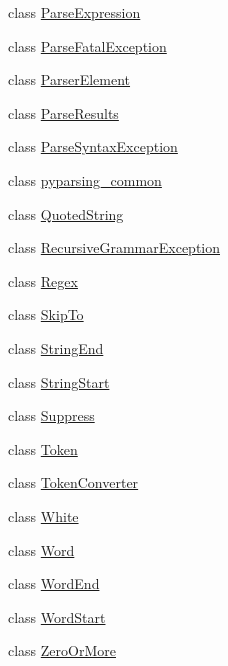 \begin{DoxyCompactItemize}
\item 
class \hyperlink{classpkg__resources_1_1__vendor_1_1pyparsing_1_1ParseExpression}{Parse\+Expression}
\item 
class \hyperlink{classpkg__resources_1_1__vendor_1_1pyparsing_1_1ParseFatalException}{Parse\+Fatal\+Exception}
\item 
class \hyperlink{classpkg__resources_1_1__vendor_1_1pyparsing_1_1ParserElement}{Parser\+Element}
\item 
class \hyperlink{classpkg__resources_1_1__vendor_1_1pyparsing_1_1ParseResults}{Parse\+Results}
\item 
class \hyperlink{classpkg__resources_1_1__vendor_1_1pyparsing_1_1ParseSyntaxException}{Parse\+Syntax\+Exception}
\item 
class \hyperlink{classpkg__resources_1_1__vendor_1_1pyparsing_1_1pyparsing__common}{pyparsing\+\_\+common}
\item 
class \hyperlink{classpkg__resources_1_1__vendor_1_1pyparsing_1_1QuotedString}{Quoted\+String}
\item 
class \hyperlink{classpkg__resources_1_1__vendor_1_1pyparsing_1_1RecursiveGrammarException}{Recursive\+Grammar\+Exception}
\item 
class \hyperlink{classpkg__resources_1_1__vendor_1_1pyparsing_1_1Regex}{Regex}
\item 
class \hyperlink{classpkg__resources_1_1__vendor_1_1pyparsing_1_1SkipTo}{Skip\+To}
\item 
class \hyperlink{classpkg__resources_1_1__vendor_1_1pyparsing_1_1StringEnd}{String\+End}
\item 
class \hyperlink{classpkg__resources_1_1__vendor_1_1pyparsing_1_1StringStart}{String\+Start}
\item 
class \hyperlink{classpkg__resources_1_1__vendor_1_1pyparsing_1_1Suppress}{Suppress}
\item 
class \hyperlink{classpkg__resources_1_1__vendor_1_1pyparsing_1_1Token}{Token}
\item 
class \hyperlink{classpkg__resources_1_1__vendor_1_1pyparsing_1_1TokenConverter}{Token\+Converter}
\item 
class \hyperlink{classpkg__resources_1_1__vendor_1_1pyparsing_1_1White}{White}
\item 
class \hyperlink{classpkg__resources_1_1__vendor_1_1pyparsing_1_1Word}{Word}
\item 
class \hyperlink{classpkg__resources_1_1__vendor_1_1pyparsing_1_1WordEnd}{Word\+End}
\item 
class \hyperlink{classpkg__resources_1_1__vendor_1_1pyparsing_1_1WordStart}{Word\+Start}
\item 
class \hyperlink{classpkg__resources_1_1__vendor_1_1pyparsing_1_1ZeroOrMore}{Zero\+Or\+More}
\end{DoxyCompactItemize}
